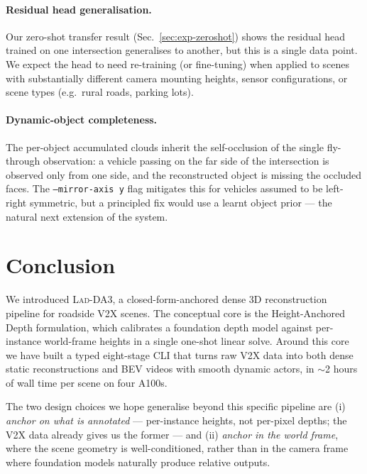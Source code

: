 \documentclass[10pt,twocolumn,letterpaper]{article}
\newcommand{\ourmethod}{\textsc{Lad-DA3}\xspace}
\begin{document}
\paragraph{Residual head generalisation.} Our zero-shot transfer
result (Sec.~\ref{sec:exp-zeroshot}) shows the residual head trained
on one intersection generalises to another, but this is a single
data point. We expect the head to need re-training (or fine-tuning)
when applied to scenes with substantially different camera mounting
heights, sensor configurations, or scene types (e.g.\ rural roads,
parking lots).

\paragraph{Dynamic-object completeness.} The per-object accumulated
clouds inherit the self-occlusion of the single fly-through
observation: a vehicle passing on the far side of the intersection is
observed only from one side, and the reconstructed object is
missing the occluded faces. The \texttt{--mirror-axis y} flag
mitigates this for vehicles assumed to be left-right symmetric, but a
principled fix would use a learnt object prior — the natural next
extension of the system.


\section{Conclusion}
\label{sec:conclusion}

We introduced \ourmethod{}, a closed-form-anchored dense 3D
reconstruction pipeline for roadside V2X scenes. The conceptual core
is the Height-Anchored Depth formulation, which calibrates a
foundation depth model against per-instance world-frame heights in a
single one-shot linear solve. Around this core we have built a
typed eight-stage CLI that turns raw V2X data into both dense static
reconstructions and BEV videos with smooth dynamic actors, in $\sim$2
hours of wall time per scene on four A100s.

The two design choices we hope generalise beyond this specific
pipeline are (i) \emph{anchor on what is annotated} — per-instance
heights, not per-pixel depths; the V2X data already gives us the
former — and (ii) \emph{anchor in the world frame}, where the scene
geometry is well-conditioned, rather than in the camera frame where
foundation models naturally produce relative outputs.


{\small


}
\end{document}
